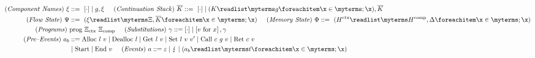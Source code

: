 \documentclass[utf8,acmsmall,review,screen,dvipsnames]{acmart}
\begin{document}
\begin{gather*}
\begin{aligned}
  \mi{(Component~Names)}~\commlib&\bnfdef\ \hole{\cdot} \mid g,\commlib \hspace{0.5cm}
  \mi{(Continuation~Stack)}~\ectxstack\bnfdef\ \hole{\cdot} \mid \tup{\ectx}{g},\ectxstack \\
  \mi{(Flow~State)}~\cfstate&\bnfdef\ \tup{\commlib}{\library,\ectxstack} \hspace{0.5cm}
  \mi{(Memory~State)}~\memstate\bnfdef\ \tup{\heap[^{\ctx}]}{\heap[^{\comp}],\store} \\
  \mi{(Programs)}~&\prog{\library_{\ctx}}{\library_{\comp}}\hspace{0.5cm}
  \mi{(Substitutions)}~\substvar\bnfdef \hole{\cdot} \mid \subst{\valueexpr}{x},\gamma \\
  \mi{(Pre\text{--}Events)}~\event[_{b}]&\bnfdef \ev{Alloc}\ \loc\ \valueexpr \mid \ev{Dealloc}\ \loc \mid \ev{Get}\ \loc\ \valueexpr \mid \ev{Set}\ \loc\ \valueexpr\ \valueexpr['] \mid \ev{Call}\ \comm\ g\ \valueexpr \mid \ev{Ret}\ \comm\ \valueexpr\\
    & \mid \ev{Start} \mid \ev{End}\ \valueexpr\hspace{0.5cm}
  \mi{(Events)}~\event\bnfdef \emptyevent \mid \lightning \mid \tup{\event[_{b}]}{\sandboxtag} \\
  \end{aligned}
\end{gather*}
\end{document}
